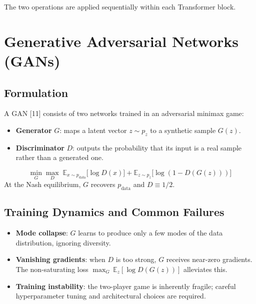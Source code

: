 \documentclass[12pt,a4paper]{report}
\begin{document}
The two operations are applied sequentially within each Transformer block.

\chapter{Generative Adversarial Networks (GANs)}

\section{Formulation}

A GAN [11] consists of two networks trained in an
adversarial minimax game:

\begin{itemize}[itemsep=1pt]
    \item \textbf{Generator} $G$: maps a latent vector $z\sim p_z$ to a
          synthetic sample $G(z)$.
    \item \textbf{Discriminator} $D$: outputs the probability that its
          input is a real sample rather than a generated one.
\end{itemize}

\begin{formulabox}
\[
    \min_G \max_D\;
    \mathbb{E}_{x\sim p_{\text{data}}}\!\bigl[\log D(x)\bigr]
    + \mathbb{E}_{z\sim p_z}\!\bigl[\log(1 - D(G(z)))\bigr]
\]
At the Nash equilibrium, $G$ recovers $p_{\text{data}}$ and $D \equiv 1/2$.
\end{formulabox}

\section{Training Dynamics and Common Failures}

\begin{itemize}[itemsep=2pt]
    \item \textbf{Mode collapse}: $G$ learns to produce only a few modes of
          the data distribution, ignoring diversity.
    \item \textbf{Vanishing gradients}: when $D$ is too strong, $G$ receives
          near-zero gradients.  The non-saturating loss
          $\max_G\,\mathbb{E}_z[\log D(G(z))]$ alleviates this.
    \item \textbf{Training instability}: the two-player game is inherently
          fragile; careful hyperparameter tuning and architectural choices are
          required.
\end{itemize}
\end{document}
